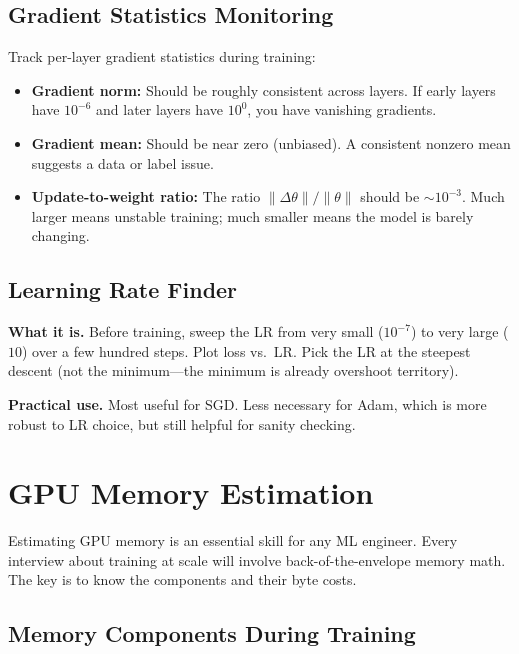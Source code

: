\subsection{Gradient Statistics Monitoring}

Track per-layer gradient statistics during training:
\begin{itemize}
    \item \textbf{Gradient norm:} Should be roughly consistent across layers. If early layers have $10^{-6}$ and later layers have $10^{0}$, you have vanishing gradients.
    \item \textbf{Gradient mean:} Should be near zero (unbiased). A consistent nonzero mean suggests a data or label issue.
    \item \textbf{Update-to-weight ratio:} The ratio $\|\Delta\theta\| / \|\theta\|$ should be $\sim 10^{-3}$. Much larger means unstable training; much smaller means the model is barely changing.
\end{itemize}

\subsection{Learning Rate Finder}

\textbf{What it is.} Before training, sweep the LR from very small ($10^{-7}$) to very large ($10$) over a few hundred steps. Plot loss vs.\ LR. Pick the LR at the steepest descent (not the minimum---the minimum is already overshoot territory).

\textbf{Practical use.} Most useful for SGD. Less necessary for Adam, which is more robust to LR choice, but still helpful for sanity checking.

\section{GPU Memory Estimation}
\label{sec:memory_estimation}

Estimating GPU memory is an essential skill for any ML engineer. Every interview about training at scale will involve back-of-the-envelope memory math. The key is to know the components and their byte costs.

\subsection{Memory Components During Training}

